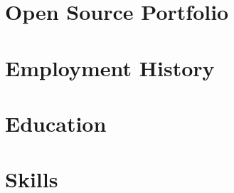 \documentclass[9pt]{resume}
\begin{document}
\maketitle

\section{Open Source Portfolio}



\section{Employment History}




\section{Education}


\section{Skills}










\end{document}
